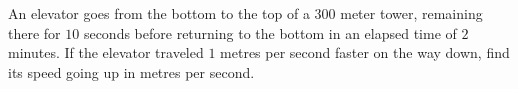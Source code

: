 An elevator goes from the bottom to the top of a $300$ meter tower, remaining there for $10$ seconds before returning to the bottom in an elapsed time of $2$ minutes. If the elevator traveled $1$ metres per second faster on the way down, find its speed going up in metres per second.
